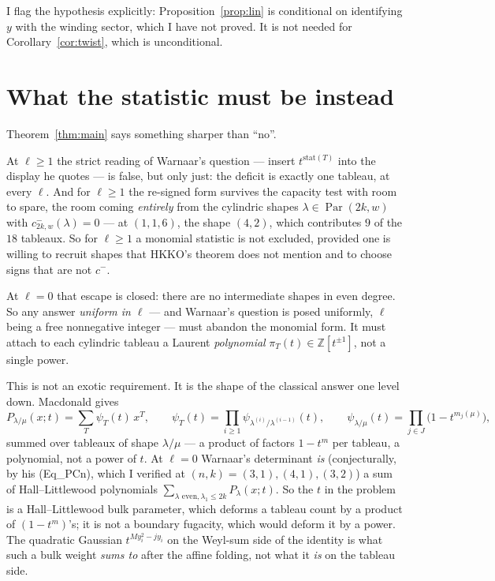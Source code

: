 \documentclass[11pt]{article}
\theoremstyle{definition}
\DeclareMathOperator{\Par}{Par}
\newcommand{\la}{\lambda}
\newcommand{\Z}{\mathbb{Z}}
\begin{document}
I flag the hypothesis explicitly: Proposition~\ref{prop:lin} is conditional on
identifying $y$ with the winding sector, which I have not proved. It is not
needed for Corollary~\ref{cor:twist}, which is unconditional.

\section{What the statistic must be instead}

Theorem~\ref{thm:main} says something sharper than ``no''.

At $\ell\ge1$ the strict reading of Warnaar's question --- insert
$t^{\mathrm{stat}(T)}$ into the display he quotes --- is false, but only just:
the deficit is exactly one tableau, at every $\ell$. And for $\ell\ge1$ the
re-signed form survives the capacity test with room to spare, the room coming \emph{entirely} from the cylindric
shapes $\la\in\Par(2k,w)$ with $c^{-}_{2k,w}(\la)=0$ --- at $(1,1,6)$, the shape
$(4,2)$, which contributes $9$ of the $18$ tableaux. So for $\ell\ge1$ a
monomial statistic is not excluded, provided one is willing to recruit shapes
that HKKO's theorem does not mention and to choose signs that are not
$c^{-}$.

At $\ell=0$ that escape is closed: there are no intermediate shapes in even
degree. So any answer \emph{uniform in $\ell$} --- and Warnaar's question is
posed uniformly, $\ell$ being a free nonnegative integer --- must abandon the
monomial form. It must attach to each cylindric tableau a Laurent
\emph{polynomial} $\pi_T(t)\in\Z[t^{\pm1}]$, not a single power.

This is not an exotic requirement. It is the shape of the classical answer one
level down. Macdonald \cite[III, (5.8$'$), (5.9$'$), (5.11$'$), pp.~229--230]{M}
gives
\[
 P_{\la/\mu}(x;t)=\sum_{T}\psi_T(t)\,x^{T},\qquad
 \psi_T(t)=\prod_{i\ge1}\psi_{\la^{(i)}/\la^{(i-1)}}(t),\qquad
 \psi_{\la/\mu}(t)=\prod_{j\in J}\bigl(1-t^{m_j(\mu)}\bigr),
\]
summed over tableaux of shape $\la/\mu$ --- a product of factors $1-t^{m}$ per
tableau, a polynomial, not a power of $t$. At $\ell=0$ Warnaar's determinant
\emph{is} (conjecturally, by his (Eq\_PCn), which I verified at
$(n,k)=(3,1),(4,1),(3,2)$) a sum of Hall--Littlewood polynomials
$\sum_{\la\text{ even},\la_1\le2k}P_\la(x;t)$. So the $t$ in the problem is a
Hall--Littlewood bulk parameter, which deforms a tableau count by a product of
$(1-t^{m})$'s; it is not a boundary fugacity, which would deform it by a power.
The quadratic Gaussian $t^{My_i^{2}-jy_i}$ on the Weyl-sum side of the identity
is what such a bulk weight \emph{sums to} after the affine folding, not what it
\emph{is} on the tableau side.
\end{document}
